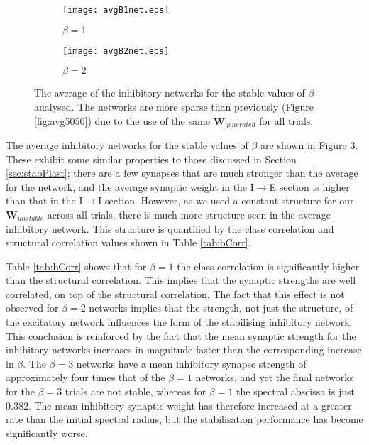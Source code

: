 \documentclass[12pt, a4paper]{article}
\begin{document}
\begin{figure}
    \begin{subfigure}{0.5\textwidth}
        \centering
        \texttt{[image: avgB1net.eps]}
        \caption{$\beta = 1$}
        \label{fig:avgB1net}
    \end{subfigure}
    \begin{subfigure}{0.5\textwidth}         
        \centering
        \texttt{[image: avgB2net.eps]}
        \caption{$\beta = 2$}
        \label{fig:avgB2net}
    \end{subfigure}
    \caption{The average of the inhibitory networks for the stable values of $\beta$ analysed.  The networks are more sparse than previously (Figure \ref{fig:avg5050}) due to the use of the same $\mathbf{W}_{generated}$ for all trials.}
    \label{fig:avgBnets}
\end{figure}

The average inhibitory networks for the stable values of $\beta$ are shown in Figure \ref{fig:avgBnets}.  These exhibit some similar properties to those discussed in Section \ref{sec:stabPlast}; there are a few synapses that are much stronger than the average for the network, and the average synaptic weight in the I$\rightarrow$E section is higher than that in the I$\rightarrow$I section.  However, as we used a constant structure for our $\mathbf{W}_{unstable}$ across all trials, there is much more structure seen in the average inhibitory network.  This structure is quantified by the class correlation and structural correlation values shown in Table \ref{tab:bCorr}. 
\FloatBarrier

Table \ref{tab:bCorr} shows that for $\beta = 1$ the class correlation is significantly higher than the structural correlation.  This implies that the synaptic strengths are well correlated, on top of the structural correlation.  The fact that this effect is not observed for $\beta = 2$ networks implies that the strength, not just the structure, of the excitatory network influences the form of the stabilising inhibitory network.  This conclusion is reinforced by the fact that the mean synaptic strength for the inhibitory networks increases in magnitude faster than the corresponding increase in $\beta$.  The $\beta = 3$ networks have a mean inhibitory synapse strength of approximately four times that of the $\beta = 1$ networks, and yet the final networks for the $\beta = 3$ trials are not stable, whereas for $\beta = 1$ the spectral abscissa is just $0.382$.  The mean inhibitory synaptic weight has therefore increased at a greater rate than the initial spectral radius, but the stabilisation performance has become significantly worse. 
\end{document}
